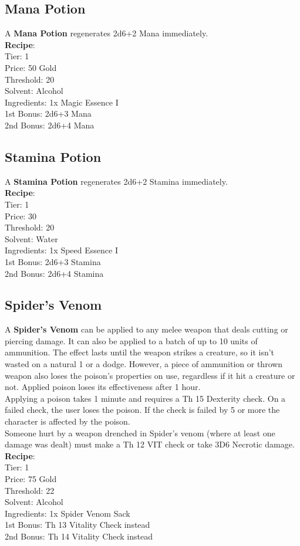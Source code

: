\subsection{Mana Potion}\label{potion:manaPotion}
A \textbf{Mana Potion} regenerates 2d6+2 Mana immediately.\\
\textbf{Recipe}:\\
Tier: 1\\
Price: 50 Gold\\
Threshold: 20\\
Solvent: Alcohol\\
Ingredients: 1x Magic Essence I\\
1st Bonus: 2d6+3 Mana\\
2nd Bonus: 2d6+4 Mana\\

\subsection{Stamina Potion}\label{potion:staminaPotion}
A \textbf{Stamina Potion} regenerates 2d6+2 Stamina immediately.\\
\textbf{Recipe}:\\
Tier: 1\\
Price: 30\\
Threshold: 20\\
Solvent: Water\\
Ingredients: 1x Speed Essence I\\
1st Bonus: 2d6+3 Stamina\\
2nd Bonus: 2d6+4 Stamina\\

\subsection{Spider's Venom}\label{potion:spidersVenom}
A \textbf{Spider's Venom} can be applied to any melee weapon that deals cutting or piercing damage.
It can also be applied to a batch of up to 10 units of ammunition.
The effect lasts until the weapon strikes a creature, so it isn't wasted on a natural 1 or a dodge.
However, a piece of ammunition or thrown weapon also loses the poison's properties on use, regardless if it hit a creature or not.
Applied poison loses its effectiveness after 1 hour.\\
Applying a poison takes 1 minute and requires a Th 15 Dexterity check.
On a failed check, the user loses the poison.
If the check is failed by 5 or more the character is affected by the poison.\\
Someone hurt by a weapon drenched in Spider's venom (where at least one damage was dealt) must make a Th 12 VIT check or take 3D6 Necrotic damage.\\
\textbf{Recipe}:\\
Tier: 1\\
Price: 75 Gold\\
Threshold: 22\\
Solvent: Alcohol\\
Ingredients: 1x Spider Venom Sack\\
1st Bonus: Th 13 Vitality Check instead\\
2nd Bonus: Th 14 Vitality Check instead\\


